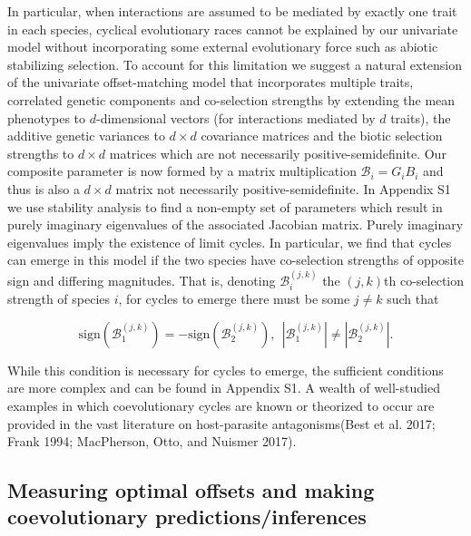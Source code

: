 \documentclass[]{article}
\begin{document}
In particular, when interactions are assumed to be mediated by exactly
one trait in each species, cyclical evolutionary races cannot be
explained by our univariate model without incorporating some external
evolutionary force such as abiotic stabilizing selection. To account for
this limitation we suggest a natural extension of the univariate
offset-matching model that incorporates multiple traits, correlated
genetic components and co-selection strengths by extending the mean
phenotypes to \(d\)-dimensional vectors (for interactions mediated by
\(d\) traits), the additive genetic variances to \(d\times d\)
covariance matrices and the biotic selection strengths to \(d\times d\)
matrices which are not necessarily positive-semidefinite. Our composite
parameter is now formed by a matrix multiplication
\(\mathscr{B}_i=G_iB_i\) and thus is also a \(d\times d\) matrix not
necessarily positive-semidefinite. In Appendix S1 we use stability
analysis to find a non-empty set of parameters which result in purely
imaginary eigenvalues of the associated Jacobian matrix. Purely
imaginary eigenvalues imply the existence of limit cycles. In
particular, we find that cycles can emerge in this model if the two
species have co-selection strengths of opposite sign and differing
magnitudes. That is, denoting \(\mathscr{B}_i^{(j,k)}\) the \((j,k)\)th
co-selection strength of species \(i\), for cycles to emerge there must
be some \(j\neq k\) such that

\begin{equation}
\mathrm{sign}(\mathscr{B}_1^{(j,k)})=-\mathrm{sign}(\mathscr{B}_2^{(j,k)}), \ \ 
|\mathscr{B}_1^{(j,k)}|\neq|\mathscr{B}_2^{(j,k)}|.
\end{equation}

While this condition is necessary for cycles to emerge, the sufficient
conditions are more complex and can be found in Appendix S1. A wealth of
well-studied examples in which coevolutionary cycles are known or
theorized to occur are provided in the vast literature on host-parasite
antagonisms(Best et al. 2017; Frank 1994; MacPherson, Otto, and Nuismer
2017).

\hypertarget{measuring-optimal-offsets-and-making-coevolutionary-predictionsinferences}{%
\subsection{Measuring optimal offsets and making coevolutionary
predictions/inferences}\label{measuring-optimal-offsets-and-making-coevolutionary-predictionsinferences}}
\end{document}
